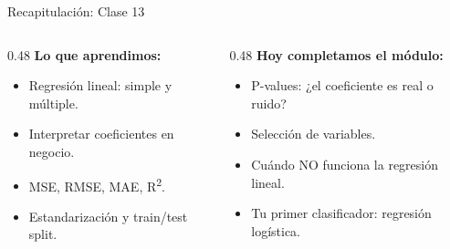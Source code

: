 \documentclass[aspectratio=169, 11pt]{beamer}
\begin{document}
\begin{frame}[shrink=5]{Recapitulación: Clase 13}
  \vspace{-4pt}
  \begin{columns}[T]
    \begin{column}{0.48\textwidth}
      {\footnotesize\bfseries\color{arcaDark} Lo que aprendimos:}
      \vspace{4pt}

      {\footnotesize
      \begin{itemize}\setlength{\itemsep}{4pt}
        \item[{\color{codeGreen}\faCheckCircle}]
          Regresión lineal: simple y múltiple.
        \item[{\color{codeGreen}\faCheckCircle}]
          Interpretar coeficientes en negocio.
        \item[{\color{codeGreen}\faCheckCircle}]
          MSE, RMSE, MAE, R\textsuperscript{2}.
        \item[{\color{codeGreen}\faCheckCircle}]
          Estandarización y train/test split.
      \end{itemize}
      }
    \end{column}

    \begin{column}{0.48\textwidth}
      {\footnotesize\bfseries\color{arcaRed} Hoy completamos el módulo:}
      \vspace{4pt}

      {\footnotesize
      \begin{itemize}\setlength{\itemsep}{4pt}
        \item[{\color{arcaRed}\faArrowRight}]
          P-values: ¿el coeficiente es real o ruido?
        \item[{\color{arcaRed}\faArrowRight}]
          Selección de variables.
        \item[{\color{arcaRed}\faArrowRight}]
          Cuándo NO funciona la regresión lineal.
        \item[{\color{arcaRed}\faArrowRight}]
          Tu primer clasificador: regresión logística.
      \end{itemize}
      }
    \end{column}
  \end{columns}
\end{frame}
\end{document}
